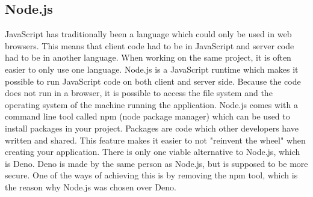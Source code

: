 \subsection{Node.js}
JavaScript has traditionally been a language which could only be used in web browsers. This means that client code had to be in JavaScript and server code had to be in another language. When working on the same project, it is often easier to only use one language. Node.js\cite{nodejs} is a JavaScript runtime which makes it possible to run JavaScript code on both client and server side. Because the code does not run in a browser, it is possible to access the file system and the operating system of the machine running the application. Node.js comes with a command line tool called npm\cite{npm} (node package manager) which can be used to install packages in your project. Packages are code which other developers have written and shared. This feature makes it easier to not "reinvent the wheel" when creating your application. There is only one viable alternative to Node.js, which is Deno\cite{deno}. Deno is made by the same person as Node.js, but is supposed to be more secure. One of the ways of achieving this is by removing the npm tool, which is the reason why Node.js was chosen over Deno.